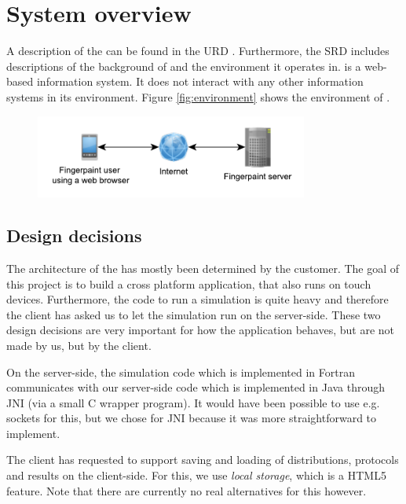 \chapter{System overview}
\label{chap:systoverview}
A description of the \applicationname{} can be found in the URD \cite{urd}. Furthermore, the SRD \cite{srd} includes descriptions of the background of \projectname{} and the environment it operates in.
\projectname{} is a web-based information system. It does not interact with any other information systems in its environment. Figure \ref{fig:environment} shows the environment of \projectname{}.

\begin{figure}[h!]
\begin{center}
\includegraphics[keepaspectratio=true,width=0.8\textwidth]{Environment.pdf}
\end{center}
\end{figure}

\section{Design decisions}
\label{sec:designdecisions}
The architecture of the \applicationname{} has mostly been determined by the customer. The goal of this project is to build a cross platform application, that also runs on touch devices. Furthermore, the code to run a simulation is quite heavy and therefore the client has asked us to let the simulation run on the server-side. These two design decisions are very important for how the application behaves, but are not made by us, but by the client.

On the server-side, the simulation code which is implemented in Fortran communicates with our server-side code which is implemented in Java through JNI (via a small C wrapper program). It would have been possible to use e.g. sockets for this, but we chose for JNI because it was more straightforward to implement.

The client has requested to support saving and loading of distributions, protocols and results on the client-side. For this, we use \emph{local storage}, which is a HTML5 feature. Note that there are currently no real alternatives for this however.